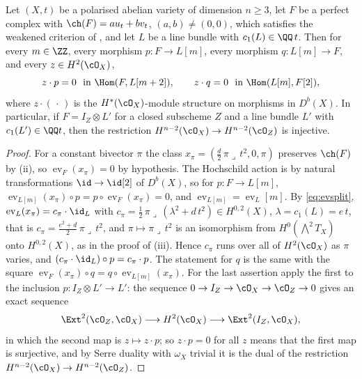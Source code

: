 \begin{lemma}
\label{lem:annihilation}
Let $(X,t)$ be a polarised abelian variety of dimension $n\ge3$, let $F$ be
a perfect complex with $\ch(F)=au_{t}+bv_{t}$, $(a,b)\ne(0,0)$, which
satisfies the weakened criterion of , and let $L$ be a
line bundle with $c_{1}(L)\in\QQ\,t$. Then for every $m\in\ZZ$, every
morphism $p\colon F\to L[m]$, every morphism $q\colon L[m]\to F$, and every
$z\in H^{2}(\cO_{X})$,
\[
  z\cdot p=0\ \ \text{in }\Hom(F,L[m+2]),\qquad
  z\cdot q=0\ \ \text{in }\Hom(L[m],F[2]),
\]
where $z\cdot(\,\cdot\,)$ is the $H^{*}(\cO_{X})$-module structure on
morphisms in $D^{b}(X)$. In particular, if $F=I_{Z}\otimes L'$ for a closed
subscheme $Z$ and a line bundle $L'$ with $c_{1}(L')\in\QQ t$, then the
restriction $H^{n-2}(\cO_{X})\to H^{n-2}(\cO_{Z})$ is injective.
\end{lemma}

\begin{proof}
For a constant bivector $\pi$ the class
$x_{\pi}=(\tfrac d2\,\pi\lrcorner\,t^{2},0,\pi)$ preserves $\ch(F)$ by
(ii), so $\operatorname{ev}_{F}(x_{\pi})=0$ by hypothesis.
The Hochschild action is by natural transformations $\id\to\id[2]$ of
$D^{b}(X)$, so for $p\colon F\to L[m]$,
$\operatorname{ev}_{L[m]}(x_{\pi})\circ p=p\circ\operatorname{ev}_{F}(x_{\pi})=0$,
and $\operatorname{ev}_{L[m]}=\operatorname{ev}_{L}[m]$. By \eqref{eq:evsplit},
$\operatorname{ev}_{L}(x_{\pi})=c_{\pi}\cdot\id_{L}$ with
$c_{\pi}=\tfrac12\,\pi\lrcorner\,(\lambda^{2}+d\,t^{2})\in H^{0,2}(X)$,
$\lambda=c_{1}(L)=e\,t$, that is $c_{\pi}=\tfrac{e^{2}+d}{2}\,\pi\lrcorner\,t^{2}$,
and $\pi\mapsto\pi\lrcorner\,t^{2}$ is an isomorphism from
$H^{0}(\bigwedge^{2}T_{X})$ onto $H^{0,2}(X)$, as in the proof of
(iii). Hence $c_{\pi}$ runs over all of $H^{2}(\cO_{X})$ as
$\pi$ varies, and $(c_{\pi}\cdot\id_{L})\circ p=c_{\pi}\cdot p$. The
statement for $q$ is the same with the square
$\operatorname{ev}_{F}(x_{\pi})\circ q=q\circ\operatorname{ev}_{L[m]}(x_{\pi})$.
For the last assertion apply the first to the inclusion
$p\colon I_{Z}\otimes L'\to L'$: the sequence
$0\to I_{Z}\to\cO_{X}\to\cO_{Z}\to0$ gives an exact sequence
\[
  \Ext^{2}(\cO_{Z},\cO_{X})\longrightarrow H^{2}(\cO_{X})
  \longrightarrow\Ext^{2}(I_{Z},\cO_{X}),
\]
in which the second map is $z\mapsto z\cdot p$; so $z\cdot p=0$ for all $z$
means that the first map is surjective, and by Serre duality with $\omega_{X}$
trivial it is the dual of the restriction
$H^{n-2}(\cO_{X})\to H^{n-2}(\cO_{Z})$.
\end{proof}

